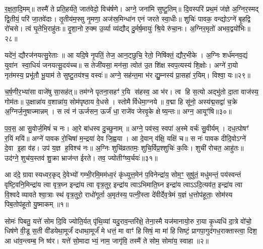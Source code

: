 र॒क्ष॒ता॒दि॒मम्॥ तस्मै॑ ते प्रति॒हर्य॑ते॒ जात॑वेदो॒ विच॑र्\mbox{}षणे। अग्ने॒ जना॑मि सुष्टु॒तिम्॥ दि॒वस्परि॑ प्रथ॒मं ज॑ज्ञे अ॒ग्निर॒स्मद् द्वि॒तीयं॒ परि॑ जा॒तवे॑दाः। तृ॒तीय॑म॒फ्सु नृ॒मणा॒ अज॑स्र॒मिन्धा॑न एनं जरते स्वा॒धीः॥ शुचिः॑ पावक॒ वन्द्योऽग्ने॑ बृ॒हद्वि रो॑चसे। त्वं घृ॒तेभि॒राहु॑तः॥ दृ॒शा॒नो रु॒क्म उ॒र्व्या व्य॑द्यौद् दु॒र्मर्\mbox{}ष॒मायुः॑ श्रि॒ये रु॑चा॒नः। अ॒ग्निर॒मृतो॑ अभव॒द्वयो॑भिः॥२८॥

यदे॑नं॒ द्यौरज॑नयत्सु॒रेताः॥ आ यदि॒षे नृ॒पतिं॒ तेज॒ आन॒ट्छुचि॒ रेतो॒ निषि॑क्तं॒ द्यौर॒भीके। अ॒ग्निः शर्ध॑मनव॒द्यं युवा॑न स्वा॒धियं॑ जनयत्सू॒दय॑च्च॥ स तेजी॑यसा॒ मन॑सा॒ त्वोत॑ उ॒त शि॑क्ष स्वप॒त्यस्य॑ शि॒क्षोः। अग्ने॑ रा॒यो नृत॑मस्य॒ प्रभू॑तौ भू॒याम॑ ते सुष्टु॒तय॑श्च॒ वस्वः॑॥ अग्ने॒ सह॑न्त॒मा भ॑र द्यु॒म्नस्य॑ प्रा॒सहा॑ र॒यिम्। विश्वा॒ यः॥२९॥

च॒र्\mbox{}ष॒णीर॒भ्या॑सा वाजे॑षु सा॒सह॑त्॥ तम॑ग्ने पृतना॒सहꣳ॑ र॒यि स॑हस्व॒ आ भ॑र। त्व हि स॒त्यो अद्भु॑तो दा॒ता वाज॑स्य॒ गोम॑तः॥ उ॒क्षान्ना॑य व॒शान्ना॑य॒ सोम॑पृष्ठाय वे॒धसे। स्तोमैर्विधेमा॒ग्नये॥ व॒द्मा हि सू॑नो॒ अस्य॑द्म॒सद्वा॑ च॒क्रे अ॒ग्निर्ज॒नुषाज्मान्नम्। स त्वं न॑ ऊर्जसन॒ ऊर्जं॑ धा॒ राजे॑व जेरवृ॒के क्षेष्य॒न्तः॥ अग्न॒ आयूꣳ॑षि॥३०॥

प॒व॒स॒ आ सु॒वोर्ज॒मिषं॑ च नः। आ॒रे बा॑धस्व दु॒च्छुनाम्॥ अग्ने॒ पव॑स्व॒ स्वपा॑ अ॒स्मे वर्चः॑ सु॒वीर्यम्। दध॒त्पोषꣳ॑ र॒यिं मयि॑॥ अग्ने॑ पावक रो॒चिषा॑ म॒न्द्रया॑ देव जि॒ह्वया। आ दे॒वान् व॑क्षि॒ यक्षि॑ च॥ स नः॑ पावक दीदि॒वोऽग्ने॑ दे॒वा इ॒हा व॑ह। उप॑ य॒ज्ञ ह॒विश्च॑ नः॥ अ॒ग्निः शुचि॑व्रततमः॒ शुचि॒र्विप्र॒श्शुचिः॑ क॒विः। शुची॑ रोचत॒ आहु॑तः॥ उद॑ग्ने॒ शुच॑य॒स्तव॑ शु॒क्रा भ्राज॑न्त ईरते। तव॒ ज्योतीꣳ॑ष्य॒र्चयः॑॥३१॥

{\anuvakamend[{पु॒रु॒नि॒ष्ठः पु॑र्वणीक भरा॒ऽभि वयो॑भि॒र्य आयूꣳ॑षि॒ विप्र॒श्शुचि॒श्चतु॑र्दश च॥14॥}]}

\setcounter{anuvakam}{0}
आ द॑दे॒ ग्रावास्यध्वर॒कृद् दे॒वेभ्यो॑ गम्भी॒रमि॒मम॑ध्व॒रं कृ॑ध्युत्त॒मेन॑ प॒विनेन्द्रा॑य॒ सोम॒ꣳ॒ सुषु॑तं॒ मधु॑मन्तं॒ पय॑स्वन्तं वृष्टि॒वनि॒मिन्द्रा॑य त्वा वृत्र॒घ्न इन्द्रा॑य त्वा वृत्र॒तुर॒ इन्द्रा॑य त्वाऽभिमाति॒घ्न इन्द्रा॑य त्वाऽऽदि॒त्यव॑त॒ इन्द्रा॑य त्वा वि॒श्वदेव्यावते श्वा॒त्राः स्थ॑ वृत्र॒तुरो॒ राधो॑गूर्ता अ॒मृत॑स्य॒ पत्नी॒स्ता दे॑वीर्देव॒त्रेमं य॒ज्ञं ध॒त्तोप॑हूताः॒ सोम॑स्य पिब॒तोप॑हूतो यु॒ष्माकम्॥१॥

सोमः॑ पिबतु॒ यत्ते॑ सोम दि॒वि ज्योति॒र्यत् पृ॑थि॒व्यां यदु॒राव॒न्तरि॑क्षे॒ तेना॒स्मै यज॑मानायो॒रु रा॒या कृ॒ध्यधि॑ दा॒त्रे वो॑चो॒ धिष॑णे वी॒डू स॒ती वी॑डयेथा॒मूर्जं॑ दधाथा॒मूर्जं॑ मे धत्तं॒ मा वाꣳ॑ हिसिषं॒ मा मा॑ हिसिष्टं॒ प्रागपा॒गुद॑गध॒राक्तास्त्वा॒ दिश॒ आ धा॑व॒न्त्वम्ब॒ नि ष्व॑र। यत्ते॑ सो॒मादाभ्यं॒ नाम॒ जागृ॑वि॒ तस्मै॑ ते सोम॒ सोमा॑य॒ स्वाहा॥२॥

